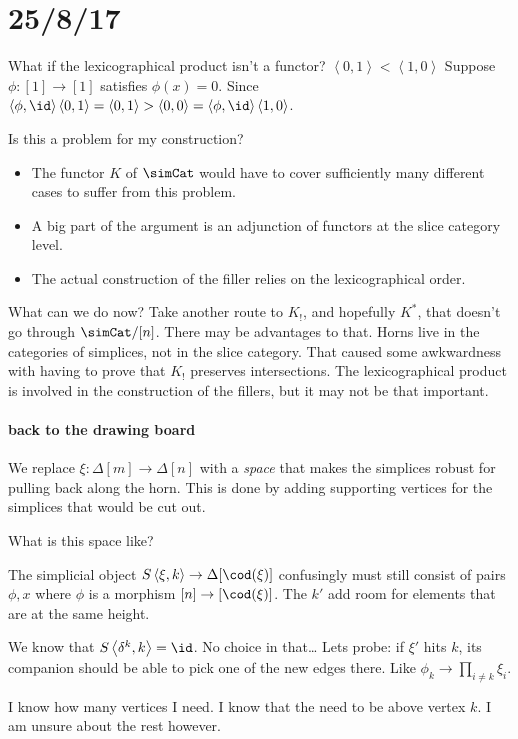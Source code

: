 \documentclass{tac}
\newcommand\of{:}
\newcommand\simplex\Delta
\newcommand\tuplet[1]{\left\langle #1 \right\rangle}
\begin{document}
\section{25/8/17}
What if the lexicographical product isn't a functor?
$\tuplet{0,1} < \tuplet{1,0}$
Suppose $\phi\of[1]\to[1]$ satisfies $\phi(x)=0$.
Since $\tuplet{\phi,\id}\tuplet{0,1}=\tuplet{0,1}>\tuplet{0,0} = \tuplet{\phi,\id}\tuplet{1,0}$.

Is this a problem for my construction?
\begin{itemize}
\item The functor $K$ of $\simCat$ would have to cover sufficiently many different cases to suffer from this problem.
\item A big part of the argument is an adjunction of functors at the slice category level.
\item The actual construction of the filler relies on the lexicographical
order.
\end{itemize}

What can we do now?
Take another route to $K_!$, and hopefully $K^*$, that doesn't go through $\simCat/[n]$.
There may be advantages to that.
Horns live in the categories of simplices, not in the slice category. That caused some awkwardness with having to prove that $K_!$ preserves intersections.
The lexicographical product is involved in the construction of the fillers, but it may not be that important.

\paragraph{back to the drawing board}
We replace $\xi\of\simplex[m]\to\simplex[n]$ with a \emph{space} that makes the simplices robust for pulling back along the horn. This is done
by adding supporting vertices for the simplices that would be cut out.

What is this space like?

The simplicial object $S\tuplet{\xi,k}\to\simplex[\cod(\xi)]$ confusingly must still consist of
pairs ${\phi,x}$ where $\phi$ is a morphism $[n]\to[\cod(\xi)]$. The $k'$ add room for elements that are at the same height.

We know that $S\tuplet{\delta^k,k} = \id$. No choice in that\dots
Lets probe: if $\xi'$ hits $k$, its companion should be able to pick one of the new edges there. Like $\phi_k\to \prod_{i\neq k} \xi_i$.

I know how many vertices I need. I know that the need to be above vertex $k$. I am unsure about the rest however.
\end{document}
